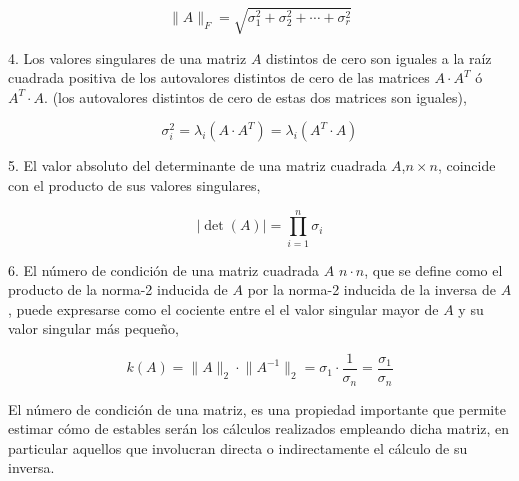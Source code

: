 \begin{equation*}
\lVert A \rVert_{F}=\sqrt{\sigma_1^2+\sigma_2^2+\cdots +\sigma_r^2}
\end{equation*}

\begin{paracol}{2}
4. Los valores singulares de una matriz $A$ distintos de cero son iguales a la raíz cuadrada positiva de los autovalores distintos de cero de las matrices $A\cdot A^T$ ó $A^T\cdot A$. (los autovalores distintos de cero de estas dos matrices son iguales),
\end{paracol}
\begin{equation*}
\sigma_i^2=\lambda_i(A\cdot A^T)=\lambda_i(A^T\cdot A)
\end{equation*}
\begin{paracol}{2}
5. El valor absoluto del determinante de una matriz cuadrada $A$,$n\times n$, coincide con el producto de sus valores singulares,
\end{paracol}
\begin{equation*}
\vert \det(A) \vert = \prod_{i=1}^n \sigma_i
\end{equation*}
\begin{paracol}{2}
6. El número de condición de una matriz cuadrada $A$ $n\cdot n$, que se define como el producto de la norma-2 inducida de $A$ por la norma-2 inducida de la inversa de $A$, puede expresarse como el cociente entre el el valor singular mayor de $A$ y su valor singular más pequeño,
\end{paracol}
\begin{equation*}
k(A)=\lVert A \rVert_2 \cdot \lVert A^{-1} \rVert_2 = \sigma_1 \cdot \frac{1}{\sigma_n}=\frac{\sigma_1}{\sigma_n}
\end{equation*}
\begin{paracol}{2}
El número de condición de una matriz, es una propiedad importante que permite estimar cómo de estables serán los cálculos realizados empleando dicha matriz, en particular aquellos que involucran directa o indirectamente el cálculo de su inversa.
\end{paracol}

